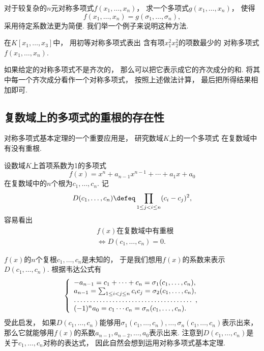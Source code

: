 对于较复杂的\(n\)元对称多项式\(f(x_1,\dotsc,x_n)\)，
求一个多项式\(g(x_1,\dotsc,x_n)\)，
使得\[
	f(x_1,\dotsc,x_n)
	=g(\sigma_1,\dotsc,\sigma_n),
\]
采用待定系数法更为简便.
我们举一个例子来说明这种方法.

\begin{example}
在\(K[x_1,\dotsc,x_3]\)中，
用初等对称多项式表出
含有项\(x_1^2 x_2^2\)的项数最少的
对称多项式\(f(x_1,\dotsc,x_n)\).
\end{example}

如果给定的对称多项式不是齐次的，
那么可以把它表示成它的齐次成分的和.
将其中每一个齐次成分看作一个对称多项式，
按照上述做法计算，
最后把所得结果相加即可.

\subsection{复数域上的多项式的重根的存在性}
对称多项式基本定理的一个重要应用是，
研究数域\(K\)上的一个多项式
在复数域中有没有重根.

设数域\(K\)上首项系数为1的多项式\[
	f(x)=x^n+a_{n-1} x^{n-1}+\dotsb+a_1 x+a_0
\]在复数域中的\(n\)个根为\(c_1,\dotsc,c_n\).
记\[
	D(c_1,\dotsc,c_n)
	\defeq
	\prod_{1\leq j<i\leq n} (c_i-c_j)^2,
\]
容易看出\begin{align*}
	&\text{$f(x)$在复数域中有重根} \\
	&\iff
	D(c_1,\dotsc,c_n)=0.
\end{align*}

\(f(x)\)的\(n\)个复根\(c_1,\dotsc,c_n\)是未知的，
于是我们想用\(f(x)\)的系数来表示\(D(c_1,\dotsc,c_n)\).
根据韦达公式有\[
	\left\{ \begin{array}{l}
		-a_{n-1}
		=c_1+\dotsb+c_n
		=\sigma_1(c_1,\dotsc,c_n), \\
		a_{n-1}
		=\sum_{1\leq i<j\leq n} c_i c_j
		=\sigma_2(c_1,\dotsc,c_n), \\
		\hdotsfor1, \\
		(-1)^n a_0
		=c_1 \dotsm c_n
		=\sigma_n(c_1,\dotsc,c_n).
	\end{array} \right.
\]
受此启发，
如果\(D(c_1,\dotsc,c_n)\)能够用\(\sigma_1(c_1,\dotsc,c_n),
\dotsc,
\sigma_n(c_1,\dotsc,c_n)\)表示出来，
那么它就能够用\(f(x)\)的系数\(a_{n-1},a_{n-2},\dotsc,a_0\)表示出来.
注意到\(D(c_1,\dotsc,c_n)\)是关于\(c_1,\dotsc,c_n\)对称的表达式，
因此自然会想到运用对称多项式基本定理.

